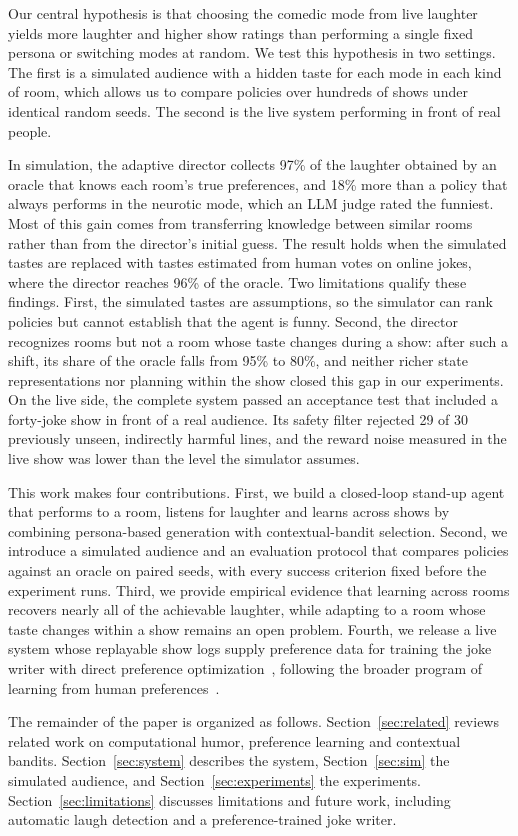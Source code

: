 Our central hypothesis is that choosing the comedic mode from live laughter yields more laughter and higher show ratings than performing a single fixed persona or switching modes at random. We test this hypothesis in two settings. The first is a simulated audience with a hidden taste for each mode in each kind of room, which allows us to compare policies over hundreds of shows under identical random seeds. The second is the live system performing in front of real people.

In simulation, the adaptive director collects 97\% of the laughter obtained by an oracle that knows each room's true preferences, and 18\% more than a policy that always performs in the neurotic mode, which an LLM judge rated the funniest. Most of this gain comes from transferring knowledge between similar rooms rather than from the director's initial guess. The result holds when the simulated tastes are replaced with tastes estimated from human votes on online jokes, where the director reaches 96\% of the oracle. Two limitations qualify these findings. First, the simulated tastes are assumptions, so the simulator can rank policies but cannot establish that the agent is funny. Second, the director recognizes rooms but not a room whose taste changes during a show: after such a shift, its share of the oracle falls from 95\% to 80\%, and neither richer state representations nor planning within the show closed this gap in our experiments. On the live side, the complete system passed an acceptance test that included a forty-joke show in front of a real audience. Its safety filter rejected 29 of 30 previously unseen, indirectly harmful lines, and the reward noise measured in the live show was lower than the level the simulator assumes.

This work makes four contributions. First, we build a closed-loop stand-up agent that performs to a room, listens for laughter and learns across shows by combining persona-based generation with contextual-bandit selection. Second, we introduce a simulated audience and an evaluation protocol that compares policies against an oracle on paired seeds, with every success criterion fixed before the experiment runs. Third, we provide empirical evidence that learning across rooms recovers nearly all of the achievable laughter, while adapting to a room whose taste changes within a show remains an open problem. Fourth, we release a live system whose replayable show logs supply preference data for training the joke writer with direct preference optimization~\cite{rafailov2023dpo}, following the broader program of learning from human preferences~\cite{christiano2017deep}.

The remainder of the paper is organized as follows. Section~\ref{sec:related} reviews related work on computational humor, preference learning and contextual bandits. Section~\ref{sec:system} describes the system, Section~\ref{sec:sim} the simulated audience, and Section~\ref{sec:experiments} the experiments. Section~\ref{sec:limitations} discusses limitations and future work, including automatic laugh detection and a preference-trained joke writer.
